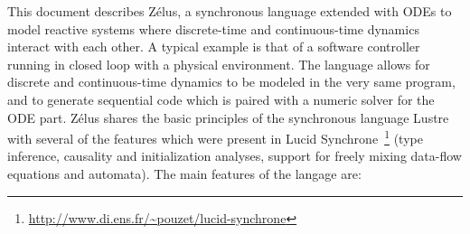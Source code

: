 \documentclass[11pt,titlepage,twoside]{report}
\newcommand{\zelus}{{\sf Z\'elus}}
\newcommand{\lustre}{{\sf Lustre}}
\newcommand{\lucy}{{\sf Lucid Synchrone}}
\begin{document}
This document describes \zelus, a synchronous language extended with 
\acp{ODE} to model reactive systems where
discrete-time and continuous-time dynamics interact with each
other. A typical example is that of a software controller running in
closed loop with a physical environment. The language allows for
discrete and continuous-time dynamics to be modeled in the very same
program, and to generate sequential code which is paired with a
numeric solver for the \ac{ODE} part. \zelus{} shares the basic principles
of the synchronous language \lustre~\cite{lustre:ieee91} with several
of the features which were present in
\lucy~\cite{lucy:iste07}\footnote{\url{http://www.di.ens.fr/~pouzet/lucid-synchrone}}
(type inference, causality and initialization analyses, support for freely 
mixing data-flow equations and automata). The main features of the langage 
are:
\end{document}
